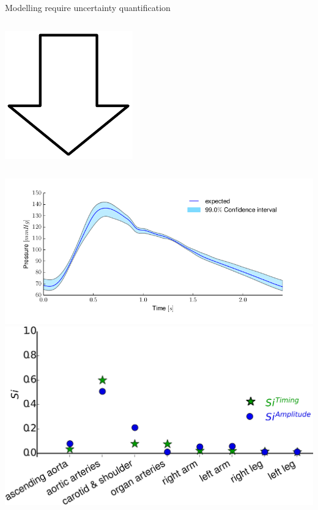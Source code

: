 \documentclass{beamer}
\begin{document}
\begin{frame}{Modelling require uncertainty quantification}{}
\begin{columns}
    \end{columns} \pause
    \begin{center}
    \includegraphics[width=.1\textwidth]{figures/south.pdf}
    \end{center}
    \begin{columns}
        \includegraphics[width=\textwidth]{ntnu/AorticPressure_parameterUncertainty.png}
        \includegraphics[width=\textwidth]{ntnu/results/sensitivity-pointOfinflection.png}
    \end{columns}
    \end{frame}
\end{document}
